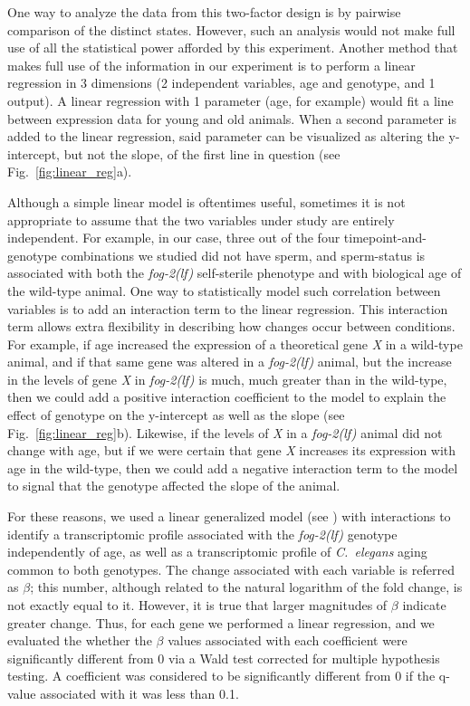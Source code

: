 \documentclass[10pt,letterpaper,twocolumn]{article}
\newcommand{\cel}{\emph{C.~elegans}}
\newcommand{\fog}{\emph{\mbox{fog-2(lf)}}}
\newcommand{\gene}[1]{\emph{\mbox{#1}}}
\begin{document}
One way to analyze the data from this two-factor design is by pairwise
comparison of the distinct states. However, such an analysis would not make full
use of all the statistical power afforded by this experiment. Another method
that makes full use of the information in our experiment is to perform a linear
regression in 3 dimensions (2 independent variables, age and genotype, and 1
output). A linear regression with 1 parameter (age, for example) would fit a
line between expression data for young and old animals. When a second parameter
is added to the linear regression, said parameter can be visualized as altering
the y-intercept, but not the slope, of the first line in question (see
Fig.~\ref{fig:linear_reg}a).

Although a simple linear model is oftentimes useful, sometimes it is not
appropriate to assume that the two variables under study are entirely
independent. For example, in our case, three out of the four timepoint-and-genotype
combinations we studied did not have sperm, and sperm-status is
associated with both the \fog{} self-sterile phenotype and with biological age
of the wild-type animal. One way to statistically model such correlation between
variables is to add an interaction term to the linear regression.
This interaction term allows extra flexibility in describing how changes occur
between conditions. For example, if age increased the expression of a
theoretical gene \gene{X} in a wild-type animal, and if that same gene was
altered in a \fog{} animal, but the increase in the levels of gene \gene{X} in
\fog{} is much, much greater than in the wild-type, then we could add a positive
interaction coefficient to the model to explain the effect of genotype on the
y-intercept as well as the slope (see Fig.~\ref{fig:linear_reg}b). Likewise, if
the levels of \gene{X} in a \fog{} animal did not change with age, but if we
were certain that gene \gene{X} increases its expression with age in the
wild-type, then we could add a negative interaction term to the model to signal
that the genotype affected the slope of the animal.

For these reasons, we used a linear generalized model (see )
with interactions to identify a transcriptomic profile associated with the
\fog{} genotype independently of age, as well as a transcriptomic profile of
\cel{} aging common to both genotypes. The change associated with each variable
is referred as $\beta$; this number, although related to the natural logarithm
of the fold change, is not exactly equal to it. However, it is true that larger
magnitudes of $\beta$ indicate greater change. Thus, for each gene we performed
a linear regression, and we evaluated the whether the $\beta$ values associated
with each coefficient were significantly different from 0 via a Wald test
corrected for multiple hypothesis testing. A coefficient was considered to be
significantly different from 0 if the q-value associated with it was less than
0.1.
\end{document}
